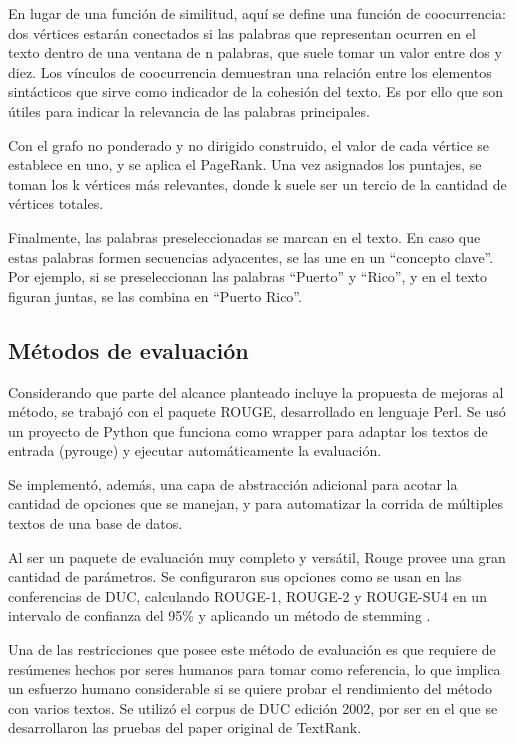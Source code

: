 \documentclass[a4paper]{article}
\begin{document}
En lugar de una función de similitud, aquí se define una función de coocurrencia: dos vértices estarán conectados si las palabras que representan ocurren en el texto dentro de una ventana de n palabras, que suele tomar un valor entre dos y diez. Los vínculos de coocurrencia demuestran una relación entre los elementos sintácticos que sirve como indicador de la cohesión del texto. Es por ello que son útiles para indicar la relevancia de las palabras principales.

Con el grafo no ponderado y no dirigido construido, el valor de cada vértice se establece en uno, y se aplica el PageRank. Una vez asignados los puntajes, se toman los k vértices más relevantes, donde k suele ser un tercio de la cantidad de vértices totales. 

Finalmente, las palabras preseleccionadas se marcan en el texto. En caso que estas palabras formen secuencias adyacentes, se las une en un “concepto clave”. Por ejemplo, si se preseleccionan las palabras “Puerto” y “Rico”, y en el texto figuran juntas, se las combina en “Puerto Rico”.


\subsection{Métodos de evaluación}
Considerando que parte del alcance planteado incluye la propuesta de mejoras al método, se trabajó con el paquete ROUGE, desarrollado en lenguaje Perl. Se usó un proyecto de Python que funciona como wrapper para adaptar los textos de entrada (pyrouge) y ejecutar automáticamente la evaluación. 

Se implementó, además, una capa de abstracción adicional para acotar la cantidad de opciones que se manejan, y para automatizar la corrida de múltiples textos de una base de datos.

Al ser un paquete de evaluación muy completo y versátil, Rouge provee una gran cantidad de parámetros. Se configuraron sus opciones como se usan en las conferencias de DUC, calculando ROUGE-1, ROUGE-2 y ROUGE-SU4 en un intervalo de confianza del 95\% y aplicando un método de stemming \cite{duc2007}. 

Una de las restricciones que posee este método de evaluación es que requiere de resúmenes hechos por seres humanos para tomar como referencia, lo que implica un esfuerzo humano considerable si se quiere probar el rendimiento del método con varios textos. Se utilizó el corpus de DUC edición 2002, por ser en el que se desarrollaron las pruebas del paper original de TextRank.
\end{document}
